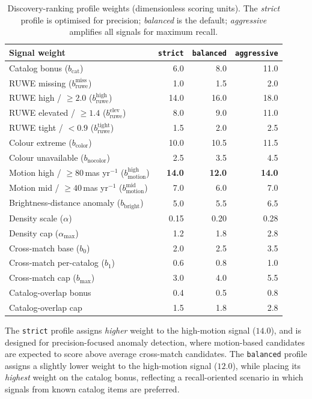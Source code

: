 \documentclass[preprint,12pt,authoryear]{elsarticle}
\begin{document}
\begin{table}[htbp]
\centering
\caption{Discovery-ranking profile weights (dimensionless scoring units). The \textit{strict} profile is optimised for precision; \textit{balanced} is the default; \textit{aggressive} amplifies all signals for maximum recall.}
\label{tab:profiles}
\begin{tabular}{lrrr}
\toprule
\textbf{Signal weight} & \texttt{strict} & \texttt{balanced} & \texttt{aggressive} \\
\midrule
Catalog bonus ($b_{\mathrm{cat}}$) & 6.0 & 8.0 & 11.0 \\
RUWE missing ($b_{\mathrm{ruwe}}^{\mathrm{miss}}$) & 1.0 & 1.5 & 2.0 \\
RUWE high / $\ge 2.0$ ($b_{\mathrm{ruwe}}^{\mathrm{high}}$) & 14.0 & 16.0 & 18.0 \\
RUWE elevated / $\ge 1.4$ ($b_{\mathrm{ruwe}}^{\mathrm{elev}}$) & 8.0 & 9.0 & 11.0 \\
RUWE tight / $<0.9$ ($b_{\mathrm{ruwe}}^{\mathrm{tight}}$) & 1.5 & 2.0 & 2.5 \\
Colour extreme ($b_{\mathrm{color}}$) & 10.0 & 10.5 & 11.5 \\
Colour unavailable ($b_{\mathrm{nocolor}}$) & 2.5 & 3.5 & 4.5 \\
Motion high / $\ge 80\,$mas yr$^{-1}$ ($b_{\mathrm{motion}}^{\mathrm{high}}$) & \textbf{14.0} & \textbf{12.0} & \textbf{14.0} \\
Motion mid / $\ge 40\,$mas yr$^{-1}$ ($b_{\mathrm{motion}}^{\mathrm{mid}}$) & 7.0 & 6.0 & 7.0 \\
Brightness-distance anomaly ($b_{\mathrm{bright}}$) & 5.0 & 5.5 & 6.5 \\
Density scale ($\alpha$) & 0.15 & 0.20 & 0.28 \\
Density cap ($\alpha_{\max}$) & 1.2 & 1.8 & 2.8 \\
Cross-match base ($b_0$) & 2.0 & 2.5 & 3.5 \\
Cross-match per-catalog ($b_1$) & 0.6 & 0.8 & 1.0 \\
Cross-match cap ($b_{\max}$) & 3.0 & 4.0 & 5.5 \\
Catalog-overlap bonus & 0.4 & 0.5 & 0.8 \\
Catalog-overlap cap & 1.5 & 1.8 & 2.8 \\
\bottomrule
\end{tabular}
\end{table}

The \texttt{strict} profile assigns \emph{higher} weight to the high-motion signal ($14.0$), and is designed for precision-focused anomaly detection, where motion-based candidates are expected to score above average cross-match candidates. The \texttt{balanced} profile assigns a slightly lower weight to the high-motion signal ($12.0$), while placing its \emph{highest} weight on the catalog bonus, reflecting a recall-oriented scenario in which signals from known catalog items are preferred.
\end{document}
